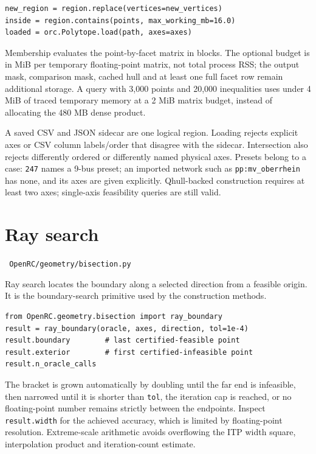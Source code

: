 \documentclass[11pt,a4paper]{report}
\newcommand{\trap}[1]{\begin{warnbox}#1\end{warnbox}}
\newcommand{\code}[1]{\texttt{\small #1}}
\newcommand{\file}[1]{\texttt{\small\color{nbgrey} #1}}
\begin{document}
\begin{lstlisting}
new_region = region.replace(vertices=new_vertices)
inside = region.contains(points, max_working_mb=16.0)
loaded = orc.Polytope.load(path, axes=axes)
\end{lstlisting}

Membership evaluates the point-by-facet matrix in blocks. The optional budget
is in MiB per temporary floating-point matrix, not total process RSS; the
output mask, comparison mask, cached hull and at least one full facet row
remain additional storage. A query with 3,000 points and 20,000 inequalities
uses under 4 MiB of traced temporary memory at a 2 MiB matrix budget, instead
of allocating the 480 MB dense product.

\trap{A saved CSV and JSON sidecar are one logical region. Loading rejects
explicit axes or CSV column labels/order that disagree with the sidecar.
Intersection also rejects differently ordered or differently named physical
axes. Presets belong to a case: \code{247} names a 9-bus preset; an imported
network such as \code{pp:mv\_oberrhein} has none, and its axes are given
explicitly. Qhull-backed construction requires at
least two axes; single-axis feasibility queries are still valid.}

\section{Ray search}

\file{OpenRC/geometry/bisection.py}

Ray search locates the boundary along a selected direction from a feasible
origin. It is the boundary-search primitive used by the construction methods.

\begin{lstlisting}
from OpenRC.geometry.bisection import ray_boundary
result = ray_boundary(oracle, axes, direction, tol=1e-4)
result.boundary        # last certified-feasible point
result.exterior        # first certified-infeasible point
result.n_oracle_calls
\end{lstlisting}

The bracket is grown automatically by doubling until the far end is infeasible,
then narrowed until it is shorter than \code{tol}, the iteration cap is reached,
or no floating-point number remains strictly between the endpoints. Inspect
\code{result.width} for the achieved accuracy, which is limited by
floating-point resolution. Extreme-scale arithmetic avoids overflowing the
ITP width square, interpolation product and iteration-count estimate.
\end{document}
